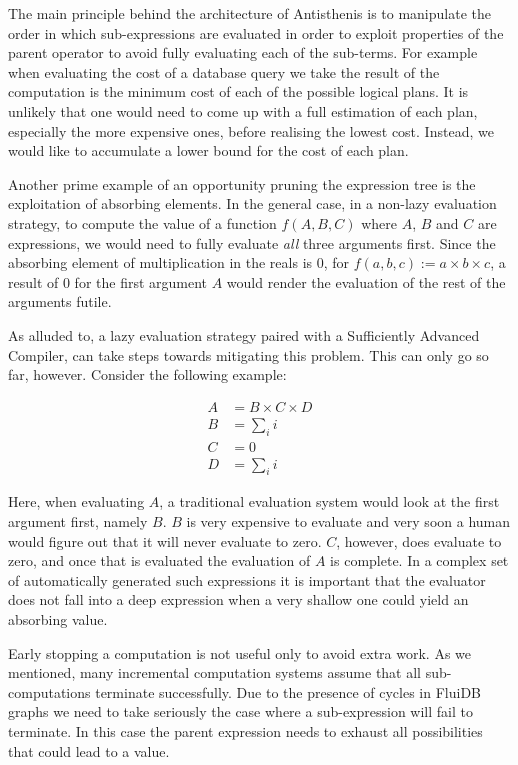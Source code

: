 The main principle behind the architecture of Antisthenis is to
manipulate the order in which sub-expressions are evaluated in order
to exploit properties of the parent operator to avoid fully evaluating
each of the sub-terms. For example when evaluating the cost of a
database query we take the result of the computation is the minimum
cost of each of the possible logical plans. It is unlikely that one
would need to come up with a full estimation of each plan, especially
the more expensive ones, before realising the lowest cost. Instead, we
would like to accumulate a lower bound for the cost of each plan.

Another prime example of an opportunity pruning the expression tree is
the exploitation of absorbing elements. In the general case, in a
non-lazy evaluation strategy, to compute the value of a function
\(f(A,B,C)\) where \(A\), \(B\) and \(C\) are expressions, we would
need to fully evaluate \emph{all} three arguments first. Since the
absorbing element of multiplication in the reals is 0, for
\(f(a,b,c) := a \times b \times c\), a result of 0 for the first
argument \(A\) would render the evaluation of the rest of the
arguments futile.

As alluded to, a lazy evaluation strategy paired with a Sufficiently
Advanced Compiler, can take steps towards mitigating this
problem. This can only go so far, however. Consider the following
example:

\begin{align*}
A &= B \times C \times D \\
B &= \sum_i{i} \\
C &= 0 \\
D &= \sum_i{i}
\end{align*}

Here, when evaluating \(A\), a traditional evaluation system would
look at the first argument first, namely \(B\). \(B\) is very
expensive to evaluate and very soon a human would figure out that it
will never evaluate to zero. \(C\), however, does evaluate to zero,
and once that is evaluated the evaluation of \(A\) is complete. In a
complex set of automatically generated such expressions it is
important that the evaluator does not fall into a deep expression when
a very shallow one could yield an absorbing value.

Early stopping a computation is not useful only to avoid extra
work. As we mentioned, many incremental computation systems assume
that all sub-computations terminate successfully. Due to the presence
of cycles in FluiDB graphs we need to take seriously the case where a
sub-expression will fail to terminate. In this case the parent
expression needs to exhaust all possibilities that could lead to a
value.


